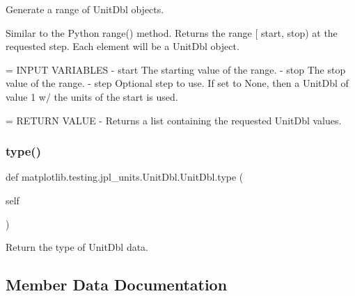 \begin{DoxyVerb}Generate a range of UnitDbl objects.

Similar to the Python range() method.  Returns the range [
start, stop) at the requested step.  Each element will be a
UnitDbl object.

= INPUT VARIABLES
- start     The starting value of the range.
- stop      The stop value of the range.
- step      Optional step to use.  If set to None, then a UnitDbl of
      value 1 w/ the units of the start is used.

= RETURN VALUE
- Returns a list containing the requested UnitDbl values.
\end{DoxyVerb}
 \mbox{\label{classmatplotlib_1_1testing_1_1jpl__units_1_1UnitDbl_1_1UnitDbl_aee67b6fd065fca60b9f6436c5dce4d52}} 
\subsubsection{\texorpdfstring{type()}{type()}}
{\footnotesize\ttfamily def matplotlib.\+testing.\+jpl\+\_\+units.\+Unit\+Dbl.\+Unit\+Dbl.\+type (\begin{DoxyParamCaption}\item[{}]{self }\end{DoxyParamCaption})}

\begin{DoxyVerb}Return the type of UnitDbl data.\end{DoxyVerb}
 

\subsection{Member Data Documentation}
\mbox{\label{classmatplotlib_1_1testing_1_1jpl__units_1_1UnitDbl_1_1UnitDbl_a7f54c38896bdcf90d0c9db33c32dbedb}} 
